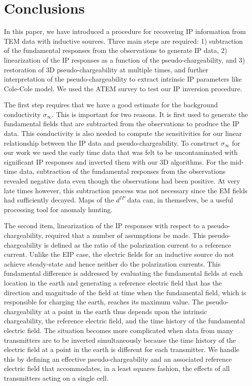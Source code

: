 \documentclass[extra,mreferee]{gji}
\newcommand{\siginf}{\sigma_\infty}
\begin{document}
\section{Conclusions}
In this paper, we have introduced a procedure for recovering IP information from TEM data with inductive sources.  Three main steps are required: 1) subtraction of the fundamental responses from the observations to generate IP data, 2) linearization of the IP responses as a function of the pseudo-chargeability, and 3) restoration of 3D pseudo-chargeability at multiple times, and further interpretation of the pseudo-chargeability to extract intrinsic IP parameters like Cole-Cole model. We used the ATEM survey to test our IP inversion procedure.

The first step requires that we have a good estimate for the background conductivity $\siginf$. This is important for two reasons. It is first used to generate the fundamental fields that are subtracted from the observations to produce the IP data. This conductivity is also needed to compute the sensitivities for our linear relationship between the IP data and pseudo-chargeability. To construct $\siginf$ for our work we used the early time data that was felt to be uncontaminated with significant IP responses and inverted them with our 3D algorithms. For the mid-time data, subtraction of the fundamental responses from the observations revealed negative data even though the observations had been positive. At very late times however, this subtraction process was not necessary since the EM fields had sufficiently decayed. Maps of the $d^{IP}$ data can, in themselves, be a useful processing tool for anomaly hunting.

The second item, linearization of the IP responses with respect to a pseudo-chargeability, required that a number of assumptions  be made. This pseudo-chargeability is defined as the ratio of the polarization current to a reference current. Unlike the EIP case, the electric fields for an inductive source do not achieve steady-state and hence neither do the polarization currents. This fundamental difference is addressed by evaluating the fundamental fields at each location in the earth and generating a reference electric field that has the direction and magnitude of the field at time when the fundamental field, which is responsible for charging the earth, reaches its maximum value. The pseudo-chargeability at a point in the earth thus depends upon the intrinsic chargeability, the reference electric field, and the time history of the fundamental electric field. The situation becomes more complicated when data from many transmitters are to be inverted simultaneously because the time history of the electric field at a point in the earth is different for each transmitter. We handle this by defining an effective pseudo-chargeability and an associated reference electric field that accommodates, in a least squares fashion, the effects of all transmitters acting on a single cell.
\end{document}
